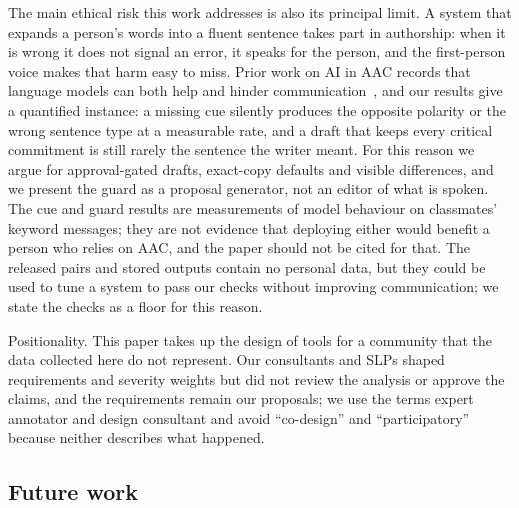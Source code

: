 The main ethical risk this work addresses is also its principal limit.
A system that expands a person's words into a fluent sentence takes part in authorship: when it is wrong it does not signal an error, it speaks for the person, and the first-person voice makes that harm easy to miss.
Prior work on AI in AAC records that language models can both help and hinder communication~\cite{valencia2023less}, and our results give a quantified instance: a missing cue silently produces the opposite polarity or the wrong sentence type at a measurable rate, and a draft that keeps every critical commitment is still rarely the sentence the writer meant.
For this reason we argue for approval-gated drafts, exact-copy defaults and visible differences, and we present the guard as a proposal generator, not an editor of what is spoken.
The cue and guard results are measurements of model behaviour on classmates' keyword messages; they are not evidence that deploying either would benefit a person who relies on AAC, and the paper should not be cited for that.
The released pairs and stored outputs contain no personal data, but they could be used to tune a system to pass our checks without improving communication; we state the checks as a floor for this reason.

Positionality.
This paper takes up the design of tools for a community that the data collected here do not represent.
Our consultants and SLPs shaped requirements and severity weights but did not review the analysis or approve the claims, and the requirements remain our proposals; we use the terms expert annotator and design consultant and avoid ``co-design'' and ``participatory'' because neither describes what happened.

\subsection{Future work}\label{sec:future}

